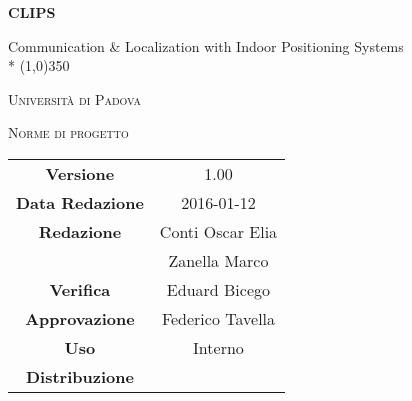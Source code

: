 \documentclass[a4paper,12pt]{article}
\author{Conti Oscar Elia, Zanella Marco}
\date{24/12/2015}
\begin{document}
\begin{titlepage}
	\centering
	{\huge\bfseries CLIPS\par}
	Communication \& Localization with Indoor Positioning Systems \\*
	\line(1,0){350} \\
	{\scshape\LARGE Università di Padova \par}
	\vspace{1cm}
	{\scshape\Large Norme di progetto \par}
	\logo
	\newpage
		\begin{tabular}{c|c}
			{\hfill \textbf{Versione}} 			& 1.00			\\
			{\hfill\textbf{Data Redazione}} 		& 2016-01-12  		\\ 
			{\hfill\textbf{Redazione}} 			&  Conti Oscar Elia \\ 
											&  Zanella Marco       \\
			{\hfill\textbf{Verifica}} 				&  Eduard Bicego   \\
			{\hfill\textbf{Approvazione}} 		&  Federico Tavella \\
			{\hfill\textbf{Uso}} 					& Interno			\\
			{\hfill\textbf{Distribuzione}} 			& \leaf			\\
		\end{tabular}
	\end{titlepage}
	\newpage
	\pagestyle{myfront}
	
		\newpage
			\tableofcontents
		\newpage
			\listoffigures	
	\label{LastFrontPage}
	\newpage
	\pagestyle{mymain}
         
    \newpage
		

	\newpage
		
	
	\newpage
		
	
	\newpage
		
		
	\label{LastPage}
\end{document}
